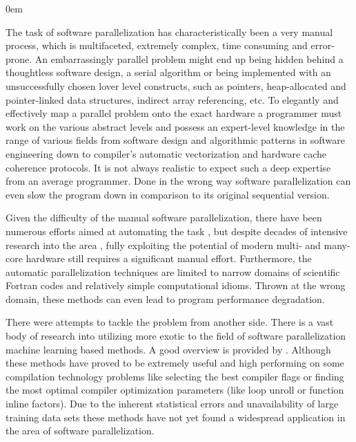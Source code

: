 \begin{description}[style=unboxed,leftmargin=0cm]
\itemsep0em
\item[\textit{Manual parallelization challenges}] The task of software parallelization has characteristically been a very manual process, which is multifaceted, extremely complex, time consuming and error-prone. An embarrassingly parallel problem might end up being hidden behind a thoughtless software design, a serial algorithm or being implemented with an unsuccessfully chosen lover level constructs, such as pointers, heap-allocated and pointer-linked data structures, indirect array referencing, etc. To elegantly and effectively map a parallel problem onto the exact hardware a programmer must work on the various abstract levels and possess an expert-level knowledge in the range of various fields from software design and algorithmic patterns in software engineering down to compiler's automatic vectorization and hardware cache coherence protocols. It is not always realistic to expect such a deep expertise from an average programmer. Done in the wrong way software parallelization can even slow the program down in comparison to its original sequential version. 
\item[\textit{Automatic parallelization limitations}] Given the difficulty of the manual software parallelization, there have been numerous efforts aimed at automating the task \cite{Bacon:1994:CTH:197405.197406}, but despite decades of intensive research into the area \cite{6813266}, fully exploiting the potential of modern multi- and many-core hardware still requires a significant manual effort. Furthermore, the automatic parallelization techniques are limited to narrow domains of scientific Fortran codes and relatively simple computational idioms. Thrown at the wrong domain, these methods can even lead to program performance degradation. 
\item[\textit{ML based parallelization applicability}] There were attempts to tackle the problem from another side. There is a vast body of research into utilizing more exotic to the field of software parallelization machine learning based methods. A good overview is provided by \cite{ml-oboyle}. Although these methods have proved to be extremely useful and high performing on some compilation technology problems like selecting the best compiler flags or finding the most optimal compiler optimization parameters (like loop unroll or function inline factors). Due to the inherent statistical errors and unavailability of large training data sets these methods have not yet found a widespread application in the area of software parallelization.
\end{description}
